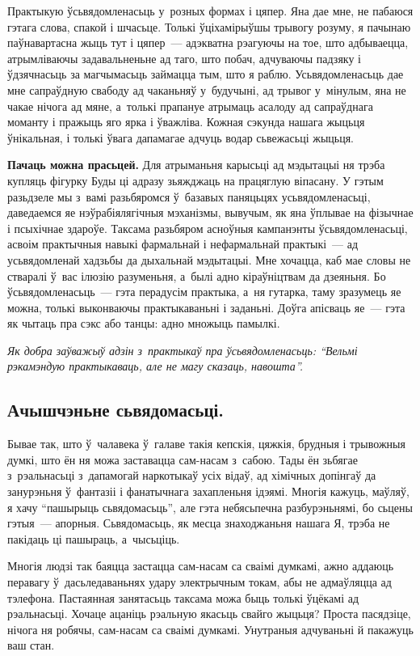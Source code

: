 Практыкую ўсьвядомленасьць у~розных формах і цяпер. Яна дае мне, не пабаюся гэтага слова, спакой і шчасьце. Толькі ўціхамірыўшы трывогу розуму, я пачынаю паўнавартасна жыць тут і цяпер~--- адэкватна рэагуючы на тое, што адбываецца, атрымліваючы задавальненьне ад таго, што побач, адчуваючы падзяку і ўдзячнасьць за магчымасьць займацца тым, што я раблю. Усьвядомленасьць дае мне сапраўдную свабоду ад чаканьняў у~будучыні, ад трывог у~мінулым, яна не чакае нічога ад мяне, а~толькі прапануе атрымаць асалоду ад сапраўднага моманту і пражыць яго ярка і ўважліва. Кожная сэкунда нашага жыцьця ўнікальная, і толькі ўвага дапамагае адчуць водар сьвежасьці жыцьця.

\textbf{Пачаць можна прасьцей.} Для атрыманьня карысьці ад мэдытацыі ня трэба купляць фігурку Буды ці адразу зьяжджаць на працяглую віпасану. У гэтым разьдзеле мы з~вамі разьбяромся ў~базавых паняцьцях усьвядомленасьці, даведаемся яе нэўрабіялягічныя мэханізмы, вывучым, як яна ўплывае на фізычнае і псыхічнае здароўе. Таксама разьбяром асноўныя кампанэнты ўсьвядомленасьці, асвоім практычныя навыкі фармальнай і нефармальнай практыкі~--- ад усьвядомленай хадзьбы да дыхальнай мэдытацыі. Мне хочацца, каб мае словы не стваралі ў~вас ілюзію разуменьня, а~былі адно кіраўніцтвам да дзеяньня. Бо ўсьвядомленасьць~--- гэта перадусім практыка, а~ня гутарка, таму зразумець яе можна, толькі выконваючы практыкаваньні і заданьні. Доўга апісваць яе~--- гэта як чытаць пра сэкс або танцы: адно множыць памылкі. 

\emph{Як добра заўважыў адзін з~практыкаў пра ўсьвядомленасьць: ``Вельмі рэкамэндую практыкаваць, але не магу сказаць, навошта''.}

\subsection*{Ачышчэньне сьвядомасьці.}

Бывае так, што ў~чалавека ў~галаве такія кепскія, цяжкія, брудныя і трывожныя думкі, што ён ня можа заставацца сам-насам з~сабою. Тады ён зьбягае з~рэальнасьці з~дапамогай наркотыкаў усіх відаў, ад хімічных допінгаў да занурэньня ў~фантазіі і фанатычнага захапленьня ідэямі. Многія кажуць, маўляў, я хачу ``пашырыць сьвядомасьць'', але гэта небясьпечна разбурэньнямі, бо сьцены гэтыя~--- апорныя. Сьвядомасьць, як месца знаходжаньня нашага Я, трэба не пакідаць ці пашыраць, а~чысьціць.

Многія людзі так баяцца застацца сам-насам са сваімі думкамі, ажно аддаюць перавагу ў~дасьледаваньнях удару электрычным токам, абы не адмаўляцца ад тэлефона. Пастаянная занятасьць таксама можа быць толькі ўцёкамі ад рэальнасьці. Хочаце ацаніць рэальную якасьць свайго жыцьця? Проста пасядзіце, нічога ня робячы, сам-насам са сваімі думкамі. Унутраныя адчуваньні й пакажуць ваш стан.

